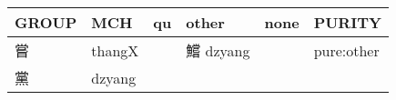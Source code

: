 \documentclass[14pt,a4paper]{scrartcl}
\begin{document}
\begin{longtable}[c]{@{}llllll@{}}
\toprule
\begin{minipage}[b]{0.14\columnwidth}\raggedright\strut
GROUP
\strut\end{minipage} &
\begin{minipage}[b]{0.14\columnwidth}\raggedright\strut
MCH
\strut\end{minipage} &
\begin{minipage}[b]{0.14\columnwidth}\raggedright\strut
qu
\strut\end{minipage} &
\begin{minipage}[b]{0.14\columnwidth}\raggedright\strut
other
\strut\end{minipage} &
\begin{minipage}[b]{0.14\columnwidth}\raggedright\strut
none
\strut\end{minipage} &
\begin{minipage}[b]{0.14\columnwidth}\raggedright\strut
PURITY
\strut\end{minipage}\tabularnewline
\midrule
\endhead
\begin{minipage}[t]{0.14\columnwidth}\raggedright\strut
嘗
\strut\end{minipage} &
\begin{minipage}[t]{0.14\columnwidth}\raggedright\strut
thangX
\strut\end{minipage} &
\begin{minipage}[t]{0.14\columnwidth}\raggedright\strut
\strut\end{minipage} &
\begin{minipage}[t]{0.14\columnwidth}\raggedright\strut
鱨 dzyang
\strut\end{minipage} &
\begin{minipage}[t]{0.14\columnwidth}\raggedright\strut
\strut\end{minipage} &
\begin{minipage}[t]{0.14\columnwidth}\raggedright\strut
pure:other
\strut\end{minipage}\tabularnewline
\begin{minipage}[t]{0.14\columnwidth}\raggedright\strut
黨
\strut\end{minipage} &
\begin{minipage}[t]{0.14\columnwidth}\raggedright\strut
dzyang
\strut\end{minipage} &
\begin{minipage}[t]{0.14\columnwidth}\raggedright\strut
\strut\end{minipage} &
\begin{minipage}[t]{0.14\columnwidth}\raggedright\strut

\end{minipage}
\end{longtable}
\end{document}
